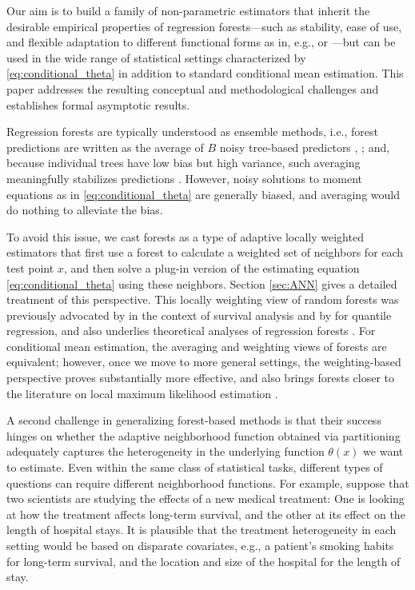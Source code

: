\documentclass[aos]{imsart}
\theoremstyle{plain}
\theoremstyle{definition}
\theoremstyle{remark}
\begin{document}
\begin{CJK}{UTF8}{gbsn}
Our aim is to build a family of non-parametric
estimators that inherit the desirable empirical properties of regression forests---such as
stability, ease of use, and flexible adaptation to different functional forms as in, e.g.,
\citet{biau2016random} or \citet{varian2014big}---but can be
used in the wide range of statistical settings characterized by \eqref{eq:conditional_theta}
in addition to standard conditional mean estimation.
This paper addresses the resulting conceptual and methodological challenges
and establishes formal asymptotic results.

Regression forests are typically understood as ensemble methods, i.e., forest
predictions  are written as the average of $B$ noisy tree-based predictors ,
;
and, because individual trees  have low bias but high variance,
such averaging meaningfully stabilizes predictions \citep{buhlmann2002analyzing,scornet2015consistency}.
However, noisy solutions to moment
equations as in \eqref{eq:conditional_theta} are generally biased, and averaging
would do nothing to alleviate the bias.

To avoid this issue, we cast forests as a type of adaptive locally weighted estimators that
first use a forest to calculate a weighted set of neighbors for each test point $x$, and then
solve a plug-in version of the estimating equation \eqref{eq:conditional_theta} using these neighbors. Section \ref{sec:ANN} gives a detailed treatment of this perspective.
This locally weighting view of random forests was previously advocated by
\citet{hothorn2004bagging} in the context of survival analysis and
by \citet{meinshausen2006quantile} for quantile regression, and also
underlies theoretical analyses of regression forests \citep[e.g.,][]{lin2006random}.
For conditional mean estimation, the averaging and weighting views of forests are equivalent;
however, once we move to more general settings, the weighting-based perspective proves substantially more effective,
and also brings forests closer to the literature on local maximum likelihood estimation
\citep{fan1996local,loader1999local,newey1994kernel,stone1977consistent,tibshirani1987local}.

A second challenge in generalizing forest-based methods is that their success hinges on whether the adaptive
neighborhood function obtained via partitioning adequately captures the
heterogeneity in the underlying function $\theta(x)$ we want to estimate.
Even within the same class of statistical tasks, different types of questions can require different neighborhood functions.
For example, suppose that two scientists are studying the effects
of a new medical treatment: One is looking at how the treatment affects long-term
survival, and the other at its effect on the length of hospital stays.
It is plausible that the treatment heterogeneity in each setting would be based on
disparate covariates, e.g., a patient's smoking habits for long-term survival,
and the location and size of the hospital for the length of stay.


\end{CJK}
\end{document}
